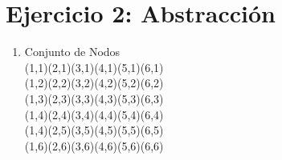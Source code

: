 \documentclass{article}
\begin{document}
\section*{Ejercicio 2: Abstracción}
\begin{enumerate}
    \item Conjunto de Nodos\\
(1,1)\qquad	(2,1)\qquad	(3,1)\qquad	(4,1)\qquad	(5,1)\qquad	(6,1)\\
(1,2)\qquad	(2,2)\qquad	(3,2)\qquad	(4,2)\qquad	(5,2)\qquad	(6,2)\\
(1,3)\qquad	(2,3)\qquad	(3,3)\qquad	(4,3)\qquad	(5,3)\qquad	(6,3)\\
(1,4)\qquad	(2,4)\qquad	(3,4)\qquad	(4,4)\qquad	(5,4)\qquad	(6,4)\\
(1,4)\qquad	(2,5)\qquad	(3,5)\qquad	(4,5)\qquad	(5,5)\qquad	(6,5)\\
(1,6)\qquad	(2,6)\qquad	(3,6)\qquad	(4,6)\qquad	(5,6)\qquad	(6,6)\\


\end{enumerate}
\end{document}

